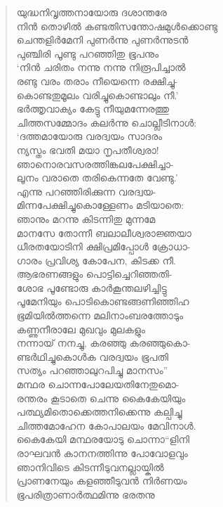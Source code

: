 \begin{verse}
യുദ്ധനിവൃത്തനായോരു ദശാന്തരേ\\
നിന്‍ തൊഴില്‍ കണ്ടതിസന്തോഷമുള്‍ക്കൊണ്ടു\\
ചെന്തളിര്‍മേനി പുണര്‍ന്നു പുണര്‍ന്നുടന്‍\\
പുഞ്ചിരി പൂണ്ടു പറഞ്ഞിതു ഭൂപനും\\
‘നിന്‍ ചരിതം നന്നു നന്നു നിരൂപിച്ചാല്‍\\
രണ്ടു വരം തരാം നീയെന്നെ രക്ഷിച്ചു-\\
കൊണ്ടതുമൂലം വരിച്ചുകൊണ്ടാലും നീ.’\\
ഭര്‍ത്തൃവാക്യം കേട്ടു നീയുമന്നേരത്തു\\
ചിത്തസമ്മോദം കല‍ര്‍ന്നു ചൊല്ലീടിനാള്‍:\\
‘ദത്തമായോരു വരദ്വയം സാദരം\\
ന്യസ്തം ഭവതി മയാ നൃപതീശ്വരാ!\\
ഞാനൊരവസരത്തിങ്കലപേക്ഷിച്ചാ-\\
ലൂനം വരാതെ തരികെന്നതേ വേണ്ടു.’\\
എന്നു പറഞ്ഞിരിക്കുന്ന വരദ്വയ-\\
മിന്നപേക്ഷിച്ചുകൊള്ളേണം മടിയാതെ:\\
ഞാനും മറന്നു കിടന്നിതു മുന്നമേ\\
മാനസേ തോന്നീ ബലാലീശ്വരാജ്ഞയാ\\
ധീരതയോടിനി ക്ഷിപ്രമിപ്പോള്‍ ക്രോധാ-\\
ഗാരം പ്രവിശ്യ കോപേന, കിടക്ക നീ.\\
ആഭരണങ്ങളും പൊട്ടിച്ചെറിഞ്ഞതി-\\
ശോഭ പൂണ്ടോരു കാര്‍കൂന്തലഴിച്ചിട്ടു\\
പൂമേനിയും പൊടികൊണ്ടങ്ങണിഞ്ഞിഹ\\
ഭൂമിയില്‍ത്തന്നെ മലിനാംബരത്തോടും\\
കണ്ണുനീരാലേ മുഖവും മുലകളും\\
നന്നായ് നനച്ചു, കരഞ്ഞു കരഞ്ഞുകൊ-\\
ണ്ടര്‍ഥിച്ചുകൊള്‍ക വരദ്വയം ഭൂപതി\\
സത്യം പറഞ്ഞാലുറപിച്ചു മാനസം”\\
മന്ഥര ചൊന്നപോലേയതിനേതുമൊ-\\
രന്തരം കൂടാതെ ചെന്നു കൈകേയിയും\\
പത്ഥ്യമിതൊക്കെത്തനിക്കെന്നു കല്പിച്ചു\\
ചിത്തമോഹേന കോപാലയം മേവിനാള്‍.\\
കൈകേയി മന്ഥരയോടു ചൊന്നാ“ളിനി\\
രാഘവന്‍ കാനനത്തിന്നു പോവോളവും\\
ഞാനിവിടെ കിടന്നീടുവനല്ലായ്കില്‍\\
പ്രാണനേയും കളഞ്ഞീടുവന്‍ നിര്‍ണയം\\
ഭൂപരിത്രാണാര്‍ത്ഥമിന്നു ഭരതനു\\

\end{verse}
